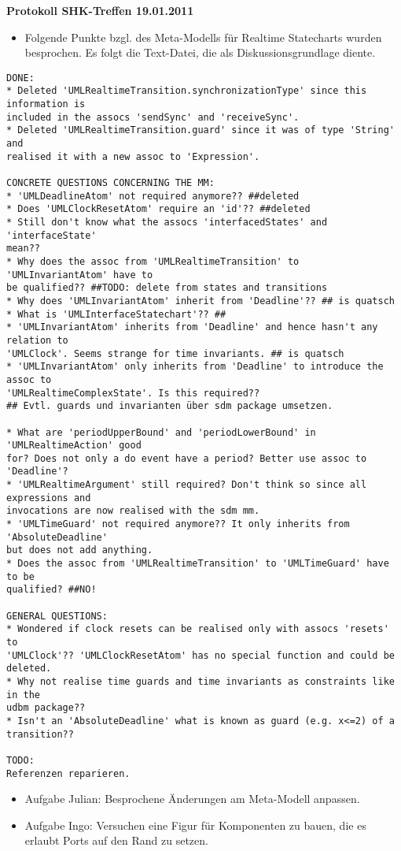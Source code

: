 \documentclass[11pt,a4paper]{article}
\begin{document}
\begin{center}

\textbf{\huge Protokoll SHK-Treffen 19.01.2011}\\[0.9cm]

\end{center}

\begin{itemize}
  \item Folgende Punkte bzgl. des Meta-Modells für Realtime Statecharts wurden
  besprochen. Es folgt die Text-Datei, die als Diskussionsgrundlage diente.
\end{itemize}

\begin{verbatim}
DONE:
* Deleted 'UMLRealtimeTransition.synchronizationType' since this information is
included in the assocs 'sendSync' and 'receiveSync'.
* Deleted 'UMLRealtimeTransition.guard' since it was of type 'String' and
realised it with a new assoc to 'Expression'.

CONCRETE QUESTIONS CONCERNING THE MM:
* 'UMLDeadlineAtom' not required anymore?? ##deleted
* Does 'UMLClockResetAtom' require an 'id'?? ##deleted
* Still don't know what the assocs 'interfacedStates' and 'interfaceState'
mean?? 
* Why does the assoc from 'UMLRealtimeTransition' to 'UMLInvariantAtom' have to
be qualified?? ##TODO: delete from states and transitions
* Why does 'UMLInvariantAtom' inherit from 'Deadline'?? ## is quatsch
* What is 'UMLInterfaceStatechart'?? ##
* 'UMLInvariantAtom' inherits from 'Deadline' and hence hasn't any relation to
'UMLClock'. Seems strange for time invariants. ## is quatsch
* 'UMLInvariantAtom' only inherits from 'Deadline' to introduce the assoc to
'UMLRealtimeComplexState'. Is this required??
## Evtl. guards und invarianten über sdm package umsetzen.

* What are 'periodUpperBound' and 'periodLowerBound' in 'UMLRealtimeAction' good
for? Does not only a do event have a period? Better use assoc to 'Deadline'?
* 'UMLRealtimeArgument' still required? Don't think so since all expressions and
invocations are now realised with the sdm mm.
* 'UMLTimeGuard' not required anymore?? It only inherits from 'AbsoluteDeadline'
but does not add anything.
* Does the assoc from 'UMLRealtimeTransition' to 'UMLTimeGuard' have to be
qualified? ##NO!

GENERAL QUESTIONS:
* Wondered if clock resets can be realised only with assocs 'resets' to
'UMLClock'?? 'UMLClockResetAtom' has no special function and could be deleted.
* Why not realise time guards and time invariants as constraints like in the
udbm package??
* Isn't an 'AbsoluteDeadline' what is known as guard (e.g. x<=2) of a
transition??

TODO:
Referenzen reparieren.
\end{verbatim}

\begin{itemize}
  \item Aufgabe Julian: Besprochene Änderungen am Meta-Modell anpassen.
  \item Aufgabe Ingo: Versuchen eine Figur für Komponenten zu bauen, die es
  erlaubt Ports auf den Rand zu setzen.
\end{itemize}
\end{document}
